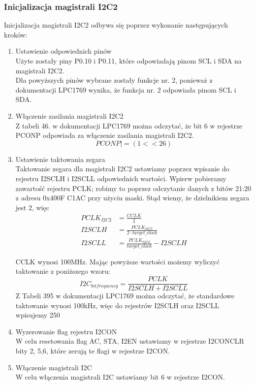 \documentclass{article}
\begin{document}
\subsubsection{Inicjalizacja magistrali I2C2}
Inicjalizacja magistrali I2C2 odbywa się poprzez wykonanie następujących kroków:
\begin{enumerate}
    \item Ustawienie odpowiednich pinów\\
        Użyte zostały piny P0.10 i P0.11, które odpowiadają pinom SCL i SDA na magistrali I2C2.\\
        Dla powyższych pinów wybrane zostały funkcje nr. 2, ponieważ z dokumentacji LPC1769 wynika, że funkcja nr. 2 odpowiada pinom SCL i SDA.\\ %
    \item Włączenie zasilania magistrali I2C2\\
        Z tabeli 46. w dokumentacji LPC1769 można odczytać, że bit 6 w rejestrze PCONP odpowiada za włączenie zasilania magistrali I2C2.
        \[
            PCONP |= (1<<26)
        \]
    \item Ustawienie taktowania zegara\\
        Taktowanie zegara dla magistrali I2C2 ustawiamy poprzez wpisanie do rejestru I2SCLH i I2SCLL odpowiednich wartości. Wpierw pobieramy zawartość rejestru PCLK; robimy to poprzez odczytanie danych z bitów 21:20 z adresu 0x400F C1AC przy użyciu maski. Stąd wiemy, że dzielnikiem zegara jest 2, więc 
        \begin{align*}
        PCLK_{I2C2} &= \frac{CCLK}{2}\\
        I2SCLH &= \frac{PCLK_{I2C2}}{2 \cdot target\_clock}\\
        I2SCLL &= \frac{PCLK_{I2C2}}{target\_clock} - I2SCLH
        \end{align*}
            

        CCLK wynosi 100MHz. Mając powyższe wartości możemy wyliczyć taktowanie z poniższego wzoru:
        \[
        I2C_{bitfrequency} = \frac{PCLK}{I2SCLH + I2SCLL}
        \]
        Z Tabeli 395 w dokumentacji LPC1769 można odczytać, że standardowe taktowanie wynosi 100kHz, więc do rejestrów I2SCLH oraz I2SCLL wpisujemy 250
    \item Wyzerowanie flag rejestru I2CON\\
        W celu resetowania flag AC, STA, I2EN ustawiamy w rejestrze I2CONCLR bity 2, 5,6, które zerują te flagi w rejestrze I2CON.
        
    \item Włączenie magistrali I2C\\
        W celu włączenia magistrali I2C ustawiamy bit 6 w rejestrze I2CON.
\end{enumerate}
\end{document}
